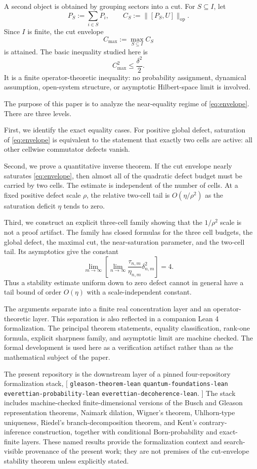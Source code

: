 \documentclass[11pt]{article}
\newcommand{\op}{\mathrm{op}}
\newcommand{\cmax}{C_{\max}}
\newcommand{\dd}{\delta}
\newcommand{\etaq}{\eta}
\newcommand{\tauq}{\tau}
\begin{document}
A second object is obtained by grouping sectors into a cut.  For
$S\subseteq I$, let
\[
  P_S:=\sum_{i\in S}P_i,\qquad
  C_S:=\|[P_S,U]\|_{\op}.
\]
Since $I$ is finite, the cut envelope
\[
  \cmax:=\max_{S\subseteq I}C_S
\]
is attained.  The basic inequality studied here is
\begin{equation}\label{eq:envelope}
  \cmax^2\le \frac{\dd^2}{2}.
\end{equation}
It is a finite operator-theoretic inequality: no probability assignment,
dynamical assumption, open-system structure, or asymptotic Hilbert-space
limit is involved.

The purpose of this paper is to analyze the near-equality regime of
\eqref{eq:envelope}.  There are three levels.

First, we identify the exact equality cases.  For positive global defect,
saturation of \eqref{eq:envelope} is equivalent to the statement that exactly
two cells are active: all other cellwise commutator defects vanish.

Second, we prove a quantitative inverse theorem.  If the cut envelope nearly
saturates \eqref{eq:envelope}, then almost all of the quadratic defect budget
must be carried by two cells.  The estimate is independent of the number of
cells.  At a fixed positive defect scale $\rho$, the relative two-cell tail is
$O(\etaq/\rho^2)$ as the saturation deficit $\etaq$ tends to zero.

Third, we construct an explicit three-cell family showing that the
$1/\rho^2$ scale is not a proof artifact.  The family has closed formulas for
the three cell budgets, the global defect, the maximal cut, the
near-saturation parameter, and the two-cell tail.  Its asymptotics give the
constant
\[
  \lim_{m\to\infty}\left[
    \lim_{n\to\infty}\frac{\tauq_{n,m}}{\etaq_{n,m}}\dd_{n,m}^2
  \right]=4.
\]
Thus a stability estimate uniform down to zero defect cannot in general have
a tail bound of order $O(\etaq)$ with a scale-independent constant.

The arguments separate into a finite real concentration layer and an
operator-theoretic layer.  This separation is also reflected in a companion
Lean 4 formalization.  The principal theorem statements, equality
classification, rank-one formula, explicit sharpness family, and asymptotic
limit are machine checked.  The formal development is used here as a
verification artifact rather than as the mathematical subject of the paper.

The present repository is the downstream layer of a pinned four-repository
formalization stack,
[
  \texttt{gleason-theorem-lean}
  \longrightarrow
  \texttt{quantum-foundations-lean}
  \longrightarrow
  \texttt{everettian-probability-lean}
  \longrightarrow
  \texttt{everettian-decoherence-lean}.
]
The stack includes machine-checked finite-dimensional versions of the Busch
and Gleason representation theorems, Naimark dilation, Wigner's theorem,
Uhlhorn-type uniqueness, Riedel's branch-decomposition theorem, and Kent's
contrary-inference construction, together with conditional Born-probability
and exact-finite layers.  These named results provide the formalization
context and search-visible provenance of the present work; they are not
premises of the cut-envelope stability theorem unless explicitly stated.
\end{document}
